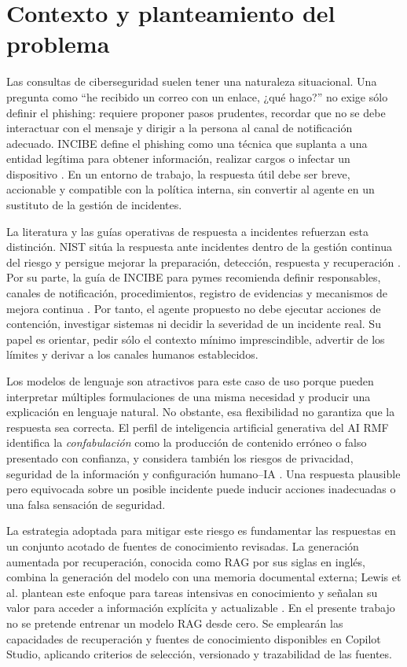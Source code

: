 \section{Contexto y planteamiento del problema}
\label{sec:contexto-problema}

Las consultas de ciberseguridad suelen tener una naturaleza situacional. Una
pregunta como ``he recibido un correo con un enlace, ¿qué hago?'' no exige sólo
definir el phishing: requiere proponer pasos prudentes, recordar que no se debe
interactuar con el mensaje y dirigir a la persona al canal de notificación
adecuado. INCIBE define el phishing como una técnica que suplanta a una entidad
legítima para obtener información, realizar cargos o infectar un dispositivo
\cite{incibePhishing}. En un entorno de trabajo, la respuesta útil debe ser
breve, accionable y compatible con la política interna, sin convertir al agente
en un sustituto de la gestión de incidentes.

La literatura y las guías operativas de respuesta a incidentes refuerzan esta
distinción. NIST sitúa la respuesta ante incidentes dentro de la gestión continua
del riesgo y persigue mejorar la preparación, detección, respuesta y recuperación
\cite{nistIncident2025}. Por su parte, la guía de INCIBE para pymes recomienda
definir responsables, canales de notificación, procedimientos, registro de
evidencias y mecanismos de mejora continua \cite{incibeCrisis}. Por tanto, el
agente propuesto no debe ejecutar acciones de contención, investigar sistemas ni
decidir la severidad de un incidente real. Su papel es orientar, pedir sólo el
contexto mínimo imprescindible, advertir de los límites y derivar a los canales
humanos establecidos.

Los modelos de lenguaje son atractivos para este caso de uso porque pueden
interpretar múltiples formulaciones de una misma necesidad y producir una
explicación en lenguaje natural. No obstante, esa flexibilidad no garantiza que
la respuesta sea correcta. El perfil de inteligencia artificial generativa del
AI RMF identifica la \emph{confabulación} como la producción de contenido
erróneo o falso presentado con confianza, y considera también los riesgos de
privacidad, seguridad de la información y configuración humano--IA
\cite{nistGenAi2024}. Una respuesta plausible pero equivocada sobre un posible
incidente puede inducir acciones inadecuadas o una falsa sensación de seguridad.

La estrategia adoptada para mitigar este riesgo es fundamentar las respuestas en
un conjunto acotado de fuentes de conocimiento revisadas. La generación
aumentada por recuperación, conocida como RAG por sus siglas en inglés, combina
la generación del modelo con una memoria documental externa; Lewis et al.
plantean este enfoque para tareas intensivas en conocimiento y señalan su valor
para acceder a información explícita y actualizable \cite{lewis2020rag}. En el
presente trabajo no se pretende entrenar un modelo RAG desde cero. Se emplearán
las capacidades de recuperación y fuentes de conocimiento disponibles en Copilot
Studio, aplicando criterios de selección, versionado y trazabilidad de las
fuentes.

